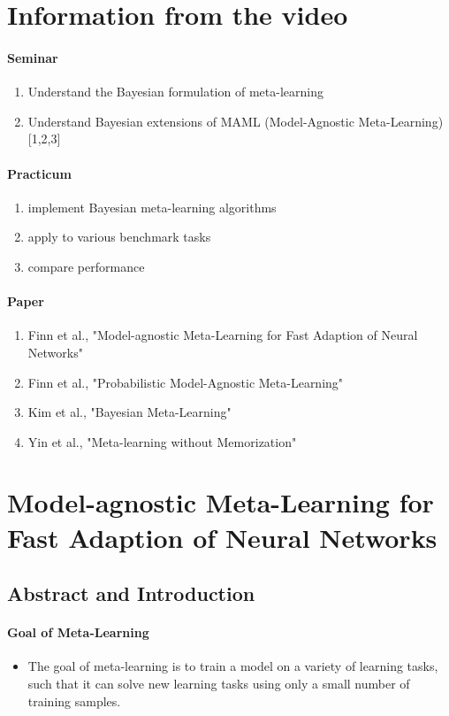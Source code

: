 \documentclass{article}
\begin{document}
	\section{Information from the video}
	\paragraph{Seminar}
	\begin{enumerate}
		\item Understand the Bayesian formulation of meta-learning
		\item Understand Bayesian extensions of MAML (Model-Agnostic Meta-Learning) [1,2,3]
	\end{enumerate}
	\paragraph{Practicum}
	\begin{enumerate}
		\item implement Bayesian meta-learning algorithms
		\item apply to various benchmark tasks
		\item compare performance
	\end{enumerate}
	\paragraph{Paper}
	\begin{enumerate}
		\item Finn et al., "Model-agnostic Meta-Learning for Fast Adaption of Neural Networks"
		\item Finn et al., "Probabilistic Model-Agnostic Meta-Learning"
		\item Kim et al., "Bayesian Meta-Learning"
		\item Yin et al., "Meta-learning without Memorization"
	\end{enumerate}

	\section{Model-agnostic Meta-Learning for Fast Adaption of Neural Networks}
	\subsection{Abstract and Introduction}
	\paragraph{Goal of Meta-Learning}
	\begin{itemize}
		\item The goal of meta-learning is to train a model on a variety of learning tasks, such that it can solve new learning tasks using only a small number of training samples.
	\end{itemize}
\end{document}
